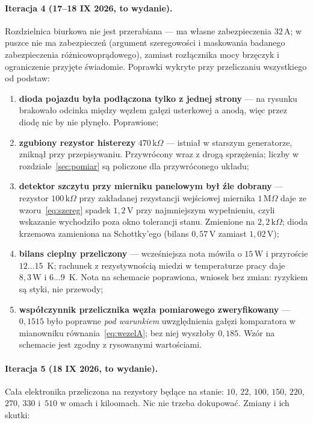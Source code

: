 \documentclass[a4paper,11pt]{article}
\newcommand{\kohm}{\,\mathrm{k}\Omega}
\newcommand{\Mohm}{\,\mathrm{M}\Omega}
\newcommand{\volt}{\,\mathrm{V}}
\newcommand{\amp}{\,\mathrm{A}}
\newcommand{\watt}{\,\mathrm{W}}
\begin{document}
\paragraph{Iteracja 4 (17--18 IX 2026, to wydanie).} Rozdzielnica biurkowa nie jest
przerabiana --- ma własne zabezpieczenia $32\amp$; w puszce nie ma zabezpieczeń
(argument szeregowości i maskowania badanego zabezpieczenia
różnicowoprądowego), zamiast rozłącznika mocy brzęczyk i ograniczenie przyjęte
świadomie. Poprawki wykryte przy przeliczaniu wszystkiego od podstaw:

\begin{enumerate}
\item \textbf{dioda pojazdu była podłączona tylko z jednej strony} --- na rysunku
      brakowało odcinka między węzłem gałęzi usterkowej a anodą, więc przez diodę
      nic by nie płynęło. Poprawione;
\item \textbf{zgubiony rezystor histerezy} $470\kohm$ --- istniał w starszym
      generatorze, zniknął przy przepisywaniu. Przywrócony wraz z drogą sprzężenia;
      liczby w rozdziale~\ref{sec:pomiar} są policzone dla przywróconego układu;
\item \textbf{detektor szczytu przy mierniku panelowym był źle dobrany} ---
      rezystor $100\kohm$ przy zakładanej rezystancji wejściowej miernika $1\Mohm$
      daje ze wzoru~\eqref{eq:szereg} spadek $1{,}2\volt$ przy najmniejszym
      wypełnieniu, czyli wskazanie wychodziło poza okno tolerancji stanu.
      Zmienione na $2{,}2\kohm$; dioda krzemowa zamieniona na Schottky'ego
      (bilans $0{,}57\volt$ zamiast $1{,}02\volt$);
\item \textbf{bilans cieplny przeliczony} --- wcześniejsza nota mówiła
      o $15\watt$ i przyroście $12\ldots15$~K; rachunek z rezystywnością miedzi
      w temperaturze pracy daje $8{,}3\watt$ i $6\ldots9$~K. Nota na schemacie
      poprawiona, wniosek bez zmian: ryzykiem są styki, nie przewody;
\item \textbf{współczynnik przelicznika węzła pomiarowego zweryfikowany} ---
      $0{,}1515$ było poprawne \emph{pod warunkiem} uwzględnienia gałęzi
      komparatora w mianowniku równania~\eqref{eq:wezelA}; bez niej wyszłoby
      $0{,}185$. Wzór na schemacie jest zgodny z rysowanymi wartościami.
\end{enumerate}

\paragraph{Iteracja 5 (18 IX 2026, to wydanie).} Cała elektronika przeliczona na
rezystory będące na stanie: $10$, $22$, $100$, $150$, $220$, $270$, $330$ i~$510$
w omach i kiloomach. Nic nie trzeba dokupować. Zmiany i ich skutki:
\end{document}
